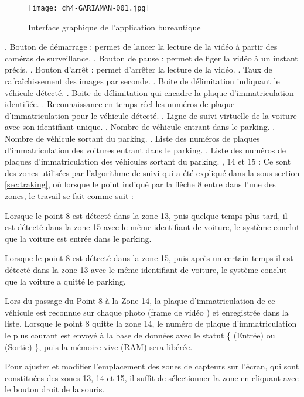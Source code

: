 \begin{figure}[H]
	\centering
	\texttt{[image: ch4-GARIAMAN-001.jpg]}
	\caption{Interface graphique de l'application bureautique }
    \label{fig:final_soft}
\end{figure}
\begin{outline}
. Bouton de démarrage : permet de lancer la lecture de la vidéo à partir des caméras de surveillance.
. Bouton de pause : permet de figer la vidéo à un instant précis.
. Bouton d'arrêt : permet d'arrêter la lecture de la vidéo.
. Taux de rafraîchissement des images par seconde.
. Boite de délimitation indiquant le véhicule détecté.
. Boite de délimitation qui encadre la plaque d'immatriculation identifiée.
. Reconnaissance en temps réel les numéros de plaque d'immatriculation pour le véhicule détecté.
. Ligne de suivi virtuelle de la voiture avec son identifiant unique.
. Nombre de véhicule entrant dans le parking.
. Nombre de véhicule sortant du parking.
. Liste des numéros de plaques d'immatriculation des voitures entrant dans le parking.
. Liste des numéros de plaques d'immatriculation des véhicules sortant du parking.
, 14 et 15 : Ce sont des zones utilisées par l'algorithme de suivi qui a été expliqué dans la sous-section \ref{sec:traking}, où lorsque le point indiqué par la flèche 8 entre dans l'une des zones, le travail se fait comme suit :
       
    \2 Lorsque le point 8 est détecté dans la zone 13, puis quelque temps plus tard, il est détecté dans la zone 15 avec le même identifiant de voiture, le système conclut que la voiture est entrée dans le parking.

    \2 Lorsque le point 8 est détecté dans la zone 15, puis après un certain temps il est détecté dans la zone 13 avec le même identifiant de voiture, le système conclut que la voiture a quitté le parking.

    \2 Lors du passage du Point 8 à la Zone 14, la plaque d'immatriculation de ce véhicule est reconnue sur chaque photo (frame de vidéo ) et enregistrée dans la liste. Lorsque le point 8 quitte la zone 14, le numéro de plaque d'immatriculation le plus courant est envoyé à la base de données avec le statut \{ (Entrée) ou (Sortie) \}, puis la mémoire vive (RAM) sera libérée.
    
\1 Pour ajuster et modifier l'emplacement des zones de capteurs sur l'écran, qui sont constituées des zones 13, 14 et 15, il suffit de sélectionner la zone en cliquant avec le bouton droit de la souris.
   
\end{outline}

